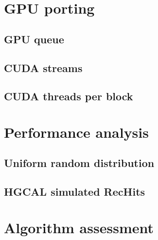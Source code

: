 \section{GPU porting}

\subsection{GPU queue}

\subsection{CUDA streams}

\subsection{CUDA threads per block}

\section{Performance analysis}

\subsection{Uniform random distribution}

\subsection{HGCAL simulated RecHits}

\section{Algorithm assessment}